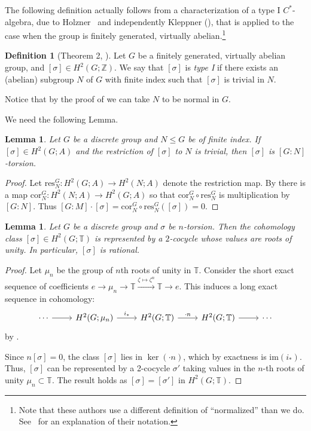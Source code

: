 \documentclass{amsart}
\newtheorem{lemma}[theorem]{Lemma}
\theoremstyle{definition}
\newtheorem{definition}[theorem]{Definition}
\newcommand{\Z}{\mathbb{Z}}
\newcommand{\TT}{\mathbb{T}}
\begin{document}
The following definition actually follows from a characterization of a type I $C^*$-algebra, due to Holzner~\cite{Ho1981} and independently  Kleppner (\cite{kleppner_type_I_cocycles}), that is applied to the case when the group is finitely generated, virtually abelian.\footnote{Note that these authors use a different definition of ``normalized'' than we do. See~\cite{KleppnerOlder} for an explanation of their notation.}
\begin{definition}[Theorem 2, \cite{kleppner_type_I_cocycles}]\label{type I cocycle definition} Let $G$ be a finitely generated, virtually abelian group, and $[\sigma]\in H^2(G;\Z)$. We say that $[\sigma]$ is \emph{type I} if there exists an (abelian) subgroup $N$ of $G$ with finite index such that $[\sigma]$ is trivial in $N$.
    
\end{definition}
Notice that by the proof of \cite[Prop. 2.14]{BL24} we can take $N$ to be normal in $G$. \par
We need the following Lemma.

\begin{lemma}\label{type I implies torsion}
Let $G$ be a discrete group and $N\le G$ be of finite index. If $[\sigma]\in H^2(G;A)$ and the restriction of $[\sigma]$ to $N$ is trivial, then $[\sigma]$ is $[G:N]$-torsion.
\end{lemma}
\begin{proof}
Let $\mathrm{res}_N^G:H^2(G;A)\rightarrow H^2(N;A)$ denote the restriction map. By \cite[III Proposition 9.5 (ii)]{coho} there is a map $\mathrm{cor}_N^G:H^2(N;A)\rightarrow H^2(G;A)$ so that $\mathrm{cor}_N^G\circ\mathrm{res}_N^G$ is multiplication by $[G:N]$. Thus $[G:M]\cdot[\sigma]=\mathrm{cor}_N^G\circ\mathrm{res}_N^G([\sigma])=0$.
\end{proof}

\begin{lemma}\label{type I implies root of unity}
Let $G$ be a discrete group and $\sigma$ be $n$-torsion.
Then the cohomology class $[\sigma] \in H^2(G;\TT)$ is represented by a
$2$-cocycle whose values are roots of unity. In particular, $[\sigma]$ is rational.
\end{lemma}
\begin{proof}
Let $\mu_n$ be the group of $n$th roots of unity in $\TT$.
Consider the short exact sequence of coefficients $e \to \mu_n \to \TT \xrightarrow{\zeta \mapsto \zeta^n} \TT \to e$. This induces a long exact sequence in cohomology:
$$
\begin{tikzcd}
\cdots \arrow[r] & {H^2(G; \mu_n)} \arrow[r, "i_{\ast}"] & {H^2(G;\TT)} \arrow[r, "\cdot n"] & {H^2(G;\TT )}\arrow[r] &\cdots
\end{tikzcd}
$$
by \cite[Section 3.E]{hatcher}.

Since $n[\sigma] = 0$, the class $[\sigma]$ lies in $\ker(\cdot n)$, which by exactness is $\mathrm{im}(i_*)$. Thus, $[\sigma]$ can be represented by a 2-cocycle $\sigma'$ taking values in the $n$-th roots of unity $\mu_n \subset \TT$. The result holds as $[\sigma] = [\sigma']$ in $H^2(G; \TT)$.
\end{proof}
\end{document}
